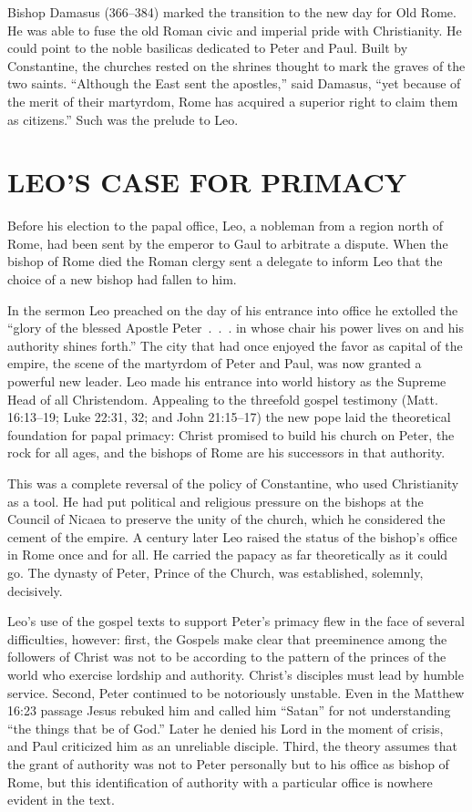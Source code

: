 Bishop Damasus (366–384) marked the transition to the new day for Old Rome. He was able to fuse the
old Roman civic and imperial pride with Christianity. He could point to the noble basilicas
dedicated to Peter and Paul. Built by Constantine, the churches rested on the shrines thought to
mark the graves of the two saints. “Although the East sent the apostles,” said Damasus, “yet because
of the merit of their martyrdom, Rome has acquired a superior right to claim them as citizens.” Such
was the prelude to Leo.

\section{LEO’S CASE FOR PRIMACY}

Before his election to the papal office, Leo, a nobleman from a region north of Rome, had been sent
by the emperor to Gaul to arbitrate a dispute. When the bishop of Rome died the Roman clergy sent a
delegate to inform Leo that the choice of a new bishop had fallen to him.

In the sermon Leo preached on the day of his entrance into office he extolled the “glory of the
blessed Apostle Peter~.~.~. in whose chair his power lives on and his authority shines forth.” The
city that had once enjoyed the favor as capital of the empire, the scene of the martyrdom of Peter
and Paul, was now granted a powerful new leader. Leo made his entrance into world history as the
Supreme Head of all Christendom. Appealing to the threefold gospel testimony (Matt. 16:13–19; Luke
22:31, 32; and John 21:15–17) the new pope laid the theoretical foundation for papal primacy: Christ
promised to build his church on Peter, the rock for all ages, and the bishops of Rome are his
successors in that authority.

This was a complete reversal of the policy of Constantine, who used Christianity as a tool. He had
put political and religious pressure on the bishops at the Council of Nicaea to preserve the unity
of the church, which he considered the cement of the empire. A century later Leo raised the status
of the bishop’s office in Rome once and for all. He carried the papacy as far theoretically as it
could go. The dynasty of Peter, Prince of the Church, was established, solemnly, decisively.

Leo’s use of the gospel texts to support Peter’s primacy flew in the face of several difficulties,
however: first, the Gospels make clear that preeminence among the followers of Christ was not to be
according to the pattern of the princes of the world who exercise lordship and authority. Christ’s
disciples must lead by humble service. Second, Peter continued to be notoriously unstable. Even in
the Matthew 16:23 passage Jesus rebuked him and called him “Satan” for not understanding “the things
that be of God.” Later he denied his Lord in the moment of crisis, and Paul criticized him as an
unreliable disciple. Third, the theory assumes that the grant of authority was not to Peter
personally but to his office as bishop of Rome, but this identification of authority with a
particular office is nowhere evident in the text.

